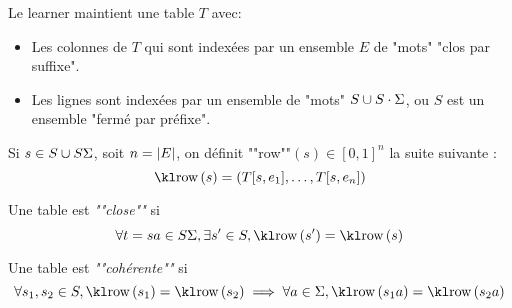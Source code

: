 Le learner maintient une table $T$ avec:

\begin{itemize}
	\item Les colonnes de $T$ qui sont indexées par un ensemble $E$ de "mots" "clos par suffixe".
	\item Les lignes sont indexées par un ensemble de "mots" $S \cup S\cdot \Sigma$, ou $S$ est
	      un ensemble "fermé par préfixe".
\end{itemize}


\begin{definition}
	Si $s \in S \cup S\Sigma$, soit $n = \left|E\right|$, on définit ""row""$(s) \in [0,1]^n$ la suite suivante :
	$$ \row s = (T[s,e_1], \ldots, T[s, e_n])$$
\end{definition}

\begin{definition}
	Une table est \emph{""close""} si
	$$ \forall t = sa \in S\alphabet, \exists s'\in S, \row {s'} = \row s$$
\end{definition}

\begin{definition}
	Une table est \emph{""cohérente""} si
	$$ \forall s_1, s_2 \in S, \row{s_1} = \row{s_2} \implies \forall a \in \alphabet, \row{s_1a} = \row{s_2a}$$
\end{definition}


